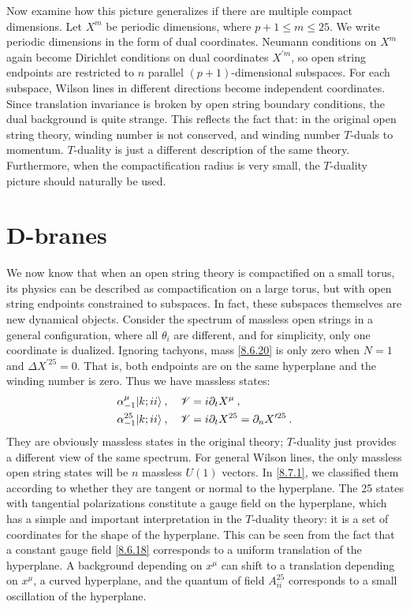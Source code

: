 Now examine how this picture generalizes if there are multiple compact dimensions. 
Let $X^{m}$ be periodic dimensions, where $p+1 \leq m \leq 25$. We write periodic dimensions in the form of dual coordinates. 
Neumann conditions on $X^{m}$ again become Dirichlet conditions on dual coordinates $X^{\prime m}$, so open string endpoints are restricted to $n$ parallel $(p+1)$-dimensional subspaces. 
For each subspace, Wilson lines in different directions become independent coordinates. 
Since translation invariance is broken by open string boundary conditions, the dual background is quite strange. This reflects the fact that: in the original open string theory, winding number is not conserved, and winding number $T$-duals to momentum. 
$T$-duality is just a different description of the same theory. Furthermore, when the compactification radius is very small, the $T$-duality picture should naturally be used.

\section{\texorpdfstring{D-branes}{8.7 D-branes}} \label{sec:8.7}
We now know that when an open string theory is compactified on a small torus, its physics can be described as compactification on a large torus, but with open string endpoints constrained to subspaces. In fact, these subspaces themselves are new dynamical objects. 
Consider the spectrum of massless open strings in a general configuration, where all $\theta_{i}$ are different, and for simplicity, only one coordinate is dualized. 
Ignoring tachyons, mass \eqref{8.6.20} is only zero when $N=1$ and $\Delta X^{\prime 25}=0 $. That is, both endpoints are on the same hyperplane and the winding number is zero. Thus we have massless states:
\begin{subequations} \label{8.7.1}
	\begin{align}
		&\alpha_{-1}^{\mu}|k; ii\rangle \:, \quad \mathscr{V} = i \partial_{t} X^{\mu}  \:, \label{8.7.1a} \\
		&\alpha_{-1}^{25} |k; ii\rangle \:, \quad \mathscr{V} = i \partial_{t} X^{25} = \partial_{n} X^{\prime 25} \:. \label{8.7.1b}
	\end{align}
\end{subequations}
They are obviously massless states in the original theory; $T$-duality just provides a different view of the same spectrum. For general Wilson lines, the only massless open string states will be $n$ massless $U(1)$ vectors. 
In \eqref{8.7.1}, we classified them according to whether they are tangent or normal to the hyperplane. 
The 25 states with tangential polarizations constitute a gauge field on the hyperplane, 
which has a simple and important interpretation in the $T$-duality theory: it is a set of coordinates for the shape of the hyperplane. This can be seen from the fact that a constant gauge field \eqref{8.6.18} corresponds to a uniform translation of the hyperplane. 
A background depending on $x^{\mu}$ can shift to a translation depending on $x^{\mu}$, a curved hyperplane, and the quantum of field $A_{ii}^{25}$ corresponds to a small oscillation of the hyperplane.

